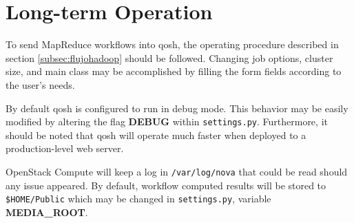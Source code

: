 \section{Long-term Operation}\label{sec:explotacionqosh}
\noindent To send MapReduce workflows into qosh, the operating procedure described in section \ref{subsec:flujohadoop} should be followed. Changing job options, cluster size, and main class may be accomplished by filling the form fields according to the user's needs.

By default qosh is configured to run in debug mode. This behavior may be easily modified by altering the flag \textbf{DEBUG} within \texttt{settings.py}. Furthermore, it should be noted that qosh will operate much faster when deployed to a production-level web server.

OpenStack Compute will keep a log in \texttt{/var/log/nova} that could be read should any issue appeared. By default, workflow computed results will be stored to \texttt{\$HOME/Public} which may be changed in \texttt{settings.py}, variable \textbf{MEDIA\_ROOT}.
